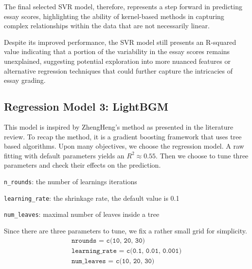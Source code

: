 \documentclass[8pt]{report}
\begin{document}
The final selected SVR model, therefore, represents a step forward in predicting essay scores, highlighting the ability of kernel-based methods in capturing complex relationships within the data that are not necessarily linear.

Despite its improved performance, the SVR model still presents an R-squared value indicating that a portion of the variability in the essay scores remains unexplained, suggesting potential exploration into more nuanced features or alternative regression techniques that could further capture the intricacies of essay grading.

\subsection{Regression Model 3: LightBGM}
This model is inspired by ZhengHeng's method as presented in the literature review.
To recap the method, it is a gradient boosting framework that uses tree based algorithms. 
Upon many objectives, we choose the regression model. 
A raw fitting with default parameters yields an $R^2 \approx 0.55$. 
Then we choose to tune three parameters and check their effects on the prediction.
\begin{compactitem}
    \item \texttt{n\_rounds}: the number of learnings iterations
    \item \texttt{learning\_rate}: the shrinkage rate, the default value is 0.1
    \item \texttt{num\_leaves}: maximal number of leaves inside a tree 
\end{compactitem}
Since there are three parameters to tune, we fix a rather small grid for simplicity. 
\begin{align*}
    \texttt{nrounds = c(10, 20, 30)} \\
    \texttt{learning\_rate = c(0.1, 0.01, 0.001)} \\
    \texttt{num\_leaves = c(10, 20, 30)}
\end{align*}
\end{document}
